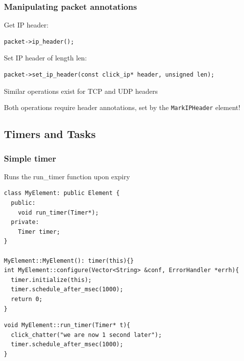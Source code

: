 \documentclass{beamer}
\begin{document}
\begin{frame}[fragile]
\frametitle{Manipulating packet annotations}
Get IP header:
\begin{lstlisting}
packet->ip_header();
\end{lstlisting}
Set IP header of length len:
\begin{lstlisting}
packet->set_ip_header(const click_ip* header, unsigned len);
\end{lstlisting}
Similar operations exist for TCP and UDP headers

Both operations require header annotations, set by the \lstinline!MarkIPHeader! element!
\end{frame}

\subsection{Timers and Tasks} %
\label{sub:timers_and_tasks}

\begin{frame}
\frametitle{Simple timer}
Runs the run\_timer function upon expiry
\begin{lstlisting}
class MyElement: public Element {
  public:
    void run_timer(Timer*);
  private:
    Timer timer;
}

MyElement::MyElement(): timer(this){}
int MyElement::configure(Vector<String> &conf, ErrorHandler *errh){
  timer.initialize(this);
  timer.schedule_after_msec(1000);
  return 0;
}
\end{lstlisting}
\begin{lstlisting}
void MyElement::run_timer(Timer* t){
  click_chatter("we are now 1 second later");
  timer.schedule_after_msec(1000);
}
\end{lstlisting}
\end{frame}
\end{document}
